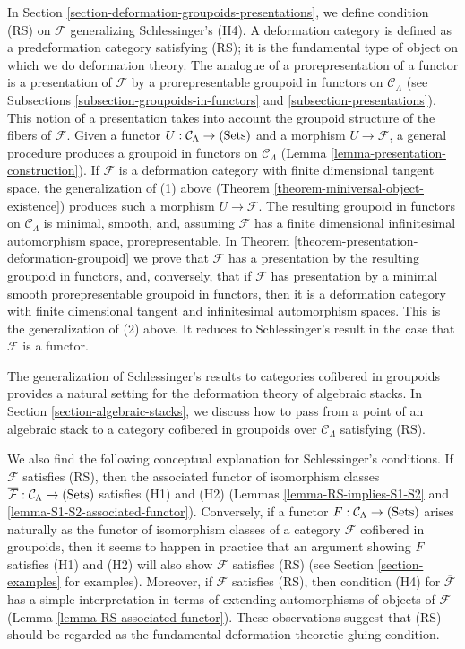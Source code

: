 \medskip \noindent
In Section \ref{section-deformation-groupoids-presentations}, we define 
condition (RS) on $\mathcal F$ generalizing Schlessinger's (H4).  A deformation 
category is defined as a predeformation category satisfying (RS); it is the 
fundamental type of object on which we do deformation theory. The analogue of a 
prorepresentation of a functor is a presentation of $\mathcal F$ by a 
prorepresentable groupoid in functors on $\mathcal C_{\Lambda}$ (see 
Subsections \ref{subsection-groupoids-in-functors} and 
\ref{subsection-presentations}). This notion of a presentation takes into 
account the groupoid structure of the fibers of $\mathcal F$. Given a functor 
$U: \mathcal C_{\Lambda} \rightarrow \textnormal{(Sets)}$ and a morphism $U 
\rightarrow \mathcal F$, a general procedure produces a groupoid in functors on 
$\mathcal C_{\Lambda}$ (Lemma \ref{lemma-presentation-construction}).  If 
$\mathcal F$ is a deformation category with finite dimensional tangent space, 
the generalization of (1) above (Theorem 
\ref{theorem-miniversal-object-existence}) produces such a morphism $U 
\rightarrow \mathcal F$.  The resulting groupoid in functors on $\mathcal 
C_{\Lambda}$ is minimal, smooth, and, assuming $\mathcal F$ has a finite 
dimensional infinitesimal automorphism space, prorepresentable. In Theorem 
\ref{theorem-presentation-deformation-groupoid} we prove that $\mathcal F$ has 
a presentation by the resulting groupoid in functors, and, conversely, that if 
$\mathcal F$ has presentation by a minimal smooth prorepresentable groupoid in 
functors, then it is a deformation category with finite dimensional tangent and 
infinitesimal automorphism spaces. This is the generalization of (2) above. It 
reduces to Schlessinger's result in the case that $\mathcal F$ is a functor.

\medskip \noindent
The generalization of Schlessinger's results to categories cofibered in 
groupoids provides a natural setting for the deformation theory of algebraic 
stacks.  In Section \ref{section-algebraic-stacks}, we discuss how to pass from 
a point of an algebraic stack to a category cofibered in groupoids over 
$\mathcal C_{\Lambda}$ satisfying (RS).

\medskip \noindent
We also find the following conceptual explanation for Schlessinger's 
conditions.  If $\mathcal F$ satisfies (RS), then the associated functor of 
isomorphism classes $\overline{\mathcal F}: \mathcal C_{\Lambda} \rightarrow 
\textnormal{(Sets)}$ satisfies (H1) and (H2) (Lemmas 
\ref{lemma-RS-implies-S1-S2} and \ref{lemma-S1-S2-associated-functor}).  
Conversely, if a functor $F: \mathcal C_{\Lambda} \rightarrow 
\textnormal{(Sets)}$ arises naturally as the functor of isomorphism classes of 
a category $\mathcal F$ cofibered in groupoids, then it seems to happen in 
practice that an argument showing $F$ satisfies (H1) and (H2) will also show 
$\mathcal F$ satisfies (RS) (see Section \ref{section-examples} for examples).  
Moreover, if $\mathcal F$ satisfies (RS), then condition (H4) for 
$\overline{\mathcal F}$ has a simple interpretation in terms of extending 
automorphisms of objects of $\mathcal F$ (Lemma 
\ref{lemma-RS-associated-functor}).  These observations suggest that (RS) 
should be regarded as the fundamental deformation theoretic gluing condition.

